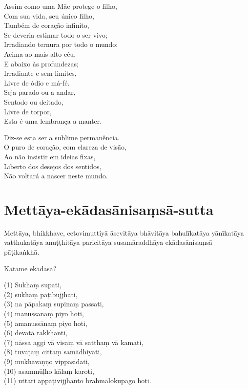 Assim como uma Mãe protege o filho,\\
Com sua vida, seu único filho,\\
Também de coração infinito,\\
Se deveria estimar todo o ser vivo;\\
Irradiando ternura por todo o mundo:\\
Acima ao mais alto céu,\\
E abaixo às profundezas;\\
Irradiante e sem limites,\\
Livre de ódio e má-fé.\\
Seja parado ou a andar,\\
Sentado ou deitado,\\
Livre de torpor,\\
Esta é uma lembrança a manter.

Diz-se esta ser a sublime permanência.\\
O puro de coração, com clareza de visão,\\
Ao não insistir em ideias fixas,\\
Liberto dos desejos dos sentidos,\\
Não voltará a nascer neste mundo.

\chapter*[Mettāya-ekādasānisaṃsā-sutta]{Mettāya-ekādasānisaṃsā-sutta}


\delegateSetUseNext

\begin{leader}
\end{leader}

Mettāya, bhikkhave, cetovimuttiyā āsevitāya bhāvitāya bahulīkatāya yānīkatāya vatthukatāya anuṭṭhitāya paricitāya susamāraddhāya ekādasānisaṃsā pāṭikaṅkhā.

Katame ekādasa?

(1) Sukhaṃ supati,\\
(2) sukhaṃ paṭibujjhati,\\
(3) na pāpakaṃ supinaṃ passati,\\
(4) manussānaṃ piyo hoti,\\
(5) amanussānaṃ piyo hoti,\\
(6) devatā rakkhanti,\\
(7) nāssa aggi vā visaṃ vā satthaṃ vā kamati,\\
(8) tuvaṭaṃ cittaṃ samādhiyati,\\
(9) mukhavaṇṇo vippasīdati,\\
(10) asammūḷho kālaṃ karoti,\\
(11) uttari appaṭivijjhanto brahmalokūpago hoti.

